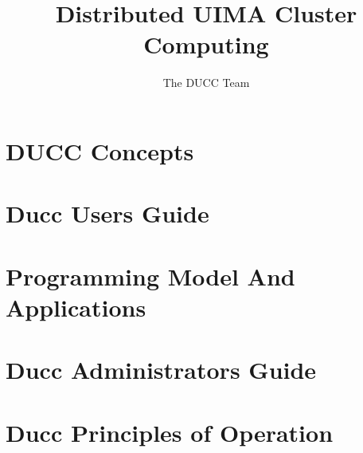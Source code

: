 \documentclass[oneside]{book}
\title{\Huge \textbf{Distributed UIMA Cluster Computing}}
\author{The DUCC Team}
\begin{document}
\frontmatter
\maketitle

\tableofcontents
\listoffigures

\mainmatter



\part{DUCC Concepts}




\part{Ducc Users Guide}


\part{Programming Model And Applications}


\part{Ducc Administrators Guide}


\part{Ducc Principles of Operation}

\end{document}
